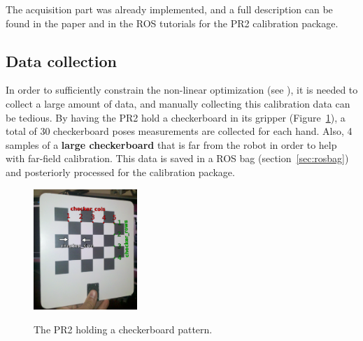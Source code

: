The acquisition part was already implemented, and a full description can be found in the paper  \cite{pr2_calibration_paper} and in the ROS tutorials for the PR2 calibration package.

%


\subsection{Data collection}

In order to sufficiently constrain the non-linear optimization (see \cite{pr2_calibration_paper}), it is needed to collect a large amount of data, and manually collecting this calibration data can be tedious. By having the PR2 hold a checkerboard in its gripper (Figure~\ref{fig:pr2_holdind_cb}), a total of 30 checkerboard poses measurements are collected for each hand. Also, 4 samples of a \textbf{large checkerboard} that is far from the robot in order to help with far-field calibration. This data is saved in a ROS bag (section~\ref{sec:rosbag}) and posteriorly processed for the calibration package.

\begin{figure}[!htbp]
  \centering
  \subfigure
  {
    \includegraphics[width=0.35\textwidth]{images/checkerboard01.png}
  }
  \caption{The PR2 holding a checkerboard pattern.}
 \label{fig:pr2_holdind_cb}
\end{figure}



